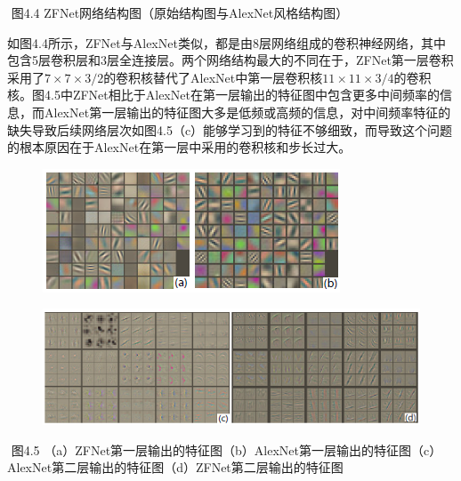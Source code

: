 ​ 图4.4 ZFNet网络结构图（原始结构图与AlexNet风格结构图）

​
如图4.4所示，ZFNet与AlexNet类似，都是由8层网络组成的卷积神经网络，其中包含5层卷积层和3层全连接层。两个网络结构最大的不同在于，ZFNet第一层卷积采用了\(7\times7\times3/2\)的卷积核替代了AlexNet中第一层卷积核\(11\times11\times3/4\)的卷积核。图4.5中ZFNet相比于AlexNet在第一层输出的特征图中包含更多中间频率的信息，而AlexNet第一层输出的特征图大多是低频或高频的信息，对中间频率特征的缺失导致后续网络层次如图4.5（c）能够学习到的特征不够细致，而导致这个问题的根本原因在于AlexNet在第一层中采用的卷积核和步长过大。

\begin{figure}
\centering
\includegraphics{./img/ch4/zfnet-layer1.png}
\caption{}
\end{figure}

\begin{figure}
\centering
\includegraphics{./img/ch4/zfnet-layer2.png}
\caption{}
\end{figure}

​ 图4.5
（a）ZFNet第一层输出的特征图（b）AlexNet第一层输出的特征图（c）AlexNet第二层输出的特征图（d）ZFNet第二层输出的特征图

